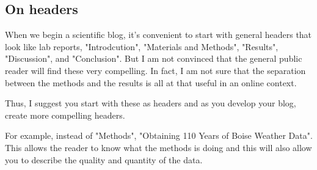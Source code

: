 \documentclass{tufte-handout}\usepackage[]{graphicx}\usepackage[]{color}
\begin{document}
\subsection{On headers}

When we begin a scientific blog, it's convenient to start with general headers that look like lab reports, "Introdcution", "Materials and Methods", "Results", "Discussion", and "Conclusion". But I am not convinced that the general public reader will find these very compelling. In fact, I am not sure that the separation between the methods and the results is all at that useful in an online context. 

Thus, I suggest you start with these as headers and as you develop your blog, create more compelling headers. 

For example, instead of "Methods", "Obtaining 110 Years of Boise Weather Data". This allows the reader to know what the methods is doing and this will also allow you to describe the quality and quantity of the data. 





\end{document}
